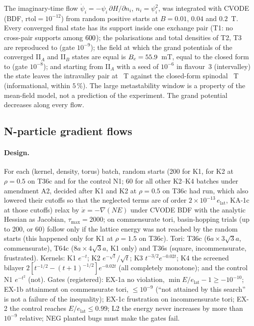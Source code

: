 \documentclass[11pt,a4paper]{article}
\newcommand{\elat}{e_{\mathrm{lat}}}
\begin{document}
The imaginary-time flow $\dot\psi_i=-\psi_i\,\partial H/\partial n_i$, $n_i=\psi_i^2$, was integrated with CVODE (BDF, $\mathrm{rtol}=10^{-12}$)
from \FFstarts{} random positive starts at $B=0.01$, $0.04$ and $0.2$~T. Every converged final state has its support inside one exchange
pair (T1: no cross-pair supports among $600{}$); the polarisations and total densities of T2, T3 are reproduced to
\FFworstRel{} (gate $10^{-9}$); the field at which the grand potentials of the converged II$_A$ and II$_B$ states are equal is
$B_c=55.9$~mT, equal to the closed form to \FFBcRel{} (gate $10^{-8}$); and starting from II$_A$ with a seed of $10^{-6}$ in flavour~3 (intervalley) the state
leaves the intravalley pair at \FFspinNum{}~T against the closed-form spinodal \FFspinCF{}~T (informational, within $5\,\%$). The large metastability window
is a property of the mean-field model, not a prediction of the experiment. The grand potential decreases along every flow.

\subsection{N-particle gradient flows}

\paragraph{Design.} For each (kernel, density, torus) batch, random starts (200 for K1, for K2 at $\rho=0.5$ on T36c and for the control N1; 60 for all other K2--K4 batches under amendment A2, decided
after K1 and K2 at $\rho=0.5$ on T36c had run, which also lowered their cutoffs so that the neglected terms are of order $2\times10^{-13}\,\elat$,
KA-1c at those cutoffs) relax by $\dot x=-\nabla(NE)$ under CVODE BDF with the analytic Hessian as Jacobian, $\tau_{\max}=2000$; on
commensurate tori, basin-hopping trials (up to 200, or 60) follow only if the lattice energy was not reached by the random starts (this
happened only for K1 at $\rho=1.5$ on T36c). Tori: T36c ($6a\times3\sqrt3a$, commensurate), T64c ($8a\times4\sqrt3a$, K1 only) and T36s (square, incommensurate,
frustrated). Kernels: K1 $e^{-t}$; K2 $e^{-\sqrt t}/\sqrt t$; K3 $t^{-3/2}e^{-0.02t}$; K4 the screened bilayer
$2[t^{-1/2}-(t+1)^{-1/2}]e^{-0.02t}$ (all completely monotone); and the control N1 $e^{-t^2}$ (not). Gates (registered): EX-1a no
violation, $\min E/\elat-1\ge-10^{-10}$; EX-1b attainment on commensurate tori, $\le10^{-9}$ (``not attained by this search'' is not a
failure of the inequality); EX-1c frustration on incommensurate tori; EX-2 the control reaches $E/\elat\le0.99$; L2 the energy
never increases by more than $10^{-9}$ relative; NEG planted bugs must make the gates fail.
\end{document}
